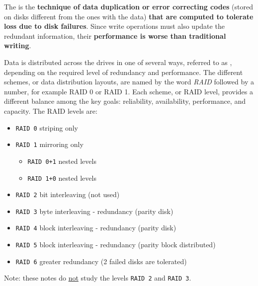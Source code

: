 \highspace
The  is the \textbf{technique of data duplication or error correcting codes} (stored on disks different from the ones with the data) \textbf{that are computed to tolerate loss due to disk failures}. Since write operations must also update the redundant information, their \textbf{performance is worse than traditional writing}.

\highspace
Data is distributed across the drives in one of several ways, referred to as , depending on the required level of redundancy and performance. The different schemes, or data distribution layouts, are named by the word \emph{RAID} followed by a number, for example RAID 0 or RAID 1. Each scheme, or RAID level, provides a different balance among the key goals: reliability, availability, performance, and capacity. The RAID levels are:
\begin{itemize}
    \item \texttt{RAID 0} striping only
    \item \texttt{RAID 1} mirroring only
    \begin{itemize}
        \item \texttt{RAID 0+1} nested levels
        \item \texttt{RAID 1+0} nested levels
    \end{itemize}
    \item \texttt{RAID 2} bit interleaving (not used)
    \item \texttt{RAID 3} byte interleaving - redundancy (parity disk)
    \item \texttt{RAID 4} block interleaving - redundancy (parity disk)
    \item \texttt{RAID 5} block interleaving - redundancy (parity block distributed)
    \item \texttt{RAID 6} greater redundancy (2 failed disks are tolerated)
\end{itemize}
Note: these notes do \underline{not} study the levels \texttt{RAID 2} and \texttt{RAID 3}.


